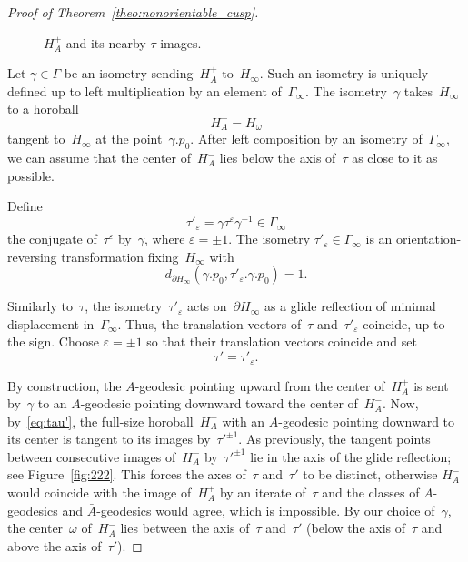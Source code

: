 \documentclass[11pt,reqno]{amsart}
\theoremstyle{definition}
\numberwithin{equation}{section}
\numberwithin{equation}{section}
\begin{document}
\begin{proof}[Proof of Theorem~\ref{theo:nonorientable_cusp}]

\medskip

\begin{figure}[htbp!]
\centering
\vspace*{1.4cm}
\hspace*{-0.5cm}
\def\svgwidth{0.4\textheight}

\vspace*{0.3cm}
\caption{$H_A^+$ and its nearby $\tau$-images.} \label{fig:111}
\end{figure}


Let $\gamma \in \Gamma$ be an isometry sending~$H_A^+$ to~$H_\infty$. 
Such an isometry is uniquely defined up to left multiplication by an element of~$\Gamma_\infty$.
The isometry~$\gamma$ takes~$H_\infty$ to a horoball
\[
H_A^- = H_\omega
\]
tangent to~$H_\infty$ at the point~$\gamma . p_0$. 
After left composition by an isometry of~$\Gamma_\infty$, we can assume that the center of~$H_A^-$ lies below the axis of~$\tau$ as close to it as possible.

Define 
\[
\tau'_\varepsilon=\gamma \tau^\varepsilon \gamma^{-1} \in \Gamma_\infty
\]
the conjugate of~$\tau^\varepsilon$ by~$\gamma$, where $\varepsilon = \pm 1$.
The isometry $\tau'_\varepsilon \in \Gamma_\infty$ is an orientation-reversing transformation fixing~$H_\infty$ with
\begin{equation} \label{eq:tau'}
d_{\partial H_\infty}(\gamma.p_0,\tau'_\varepsilon.\gamma.p_0) = 1.
\end{equation}

Similarly to~$\tau$, the isometry~$\tau'_\varepsilon$ acts on~$\partial H_\infty$ as a glide reflection of minimal displacement in~$\Gamma_\infty$.
Thus, the translation vectors of~$\tau$ and~$\tau'_\varepsilon$ coincide, up to the sign.
Choose $\varepsilon = \pm 1$ so that their translation vectors coincide and set 
\[
\tau'=\tau'_\varepsilon.
\]


By construction, the $A$-geodesic pointing upward from the center of~$H_A^+$ is sent by~$\gamma$ to an $A$-geodesic pointing downward toward the center of~$H_A^-$.
Now, by~\eqref{eq:tau'}, the full-size horoball~$H_A^-$ with an $A$-geodesic pointing downward to its center is tangent to its images by~$\tau'^{\pm 1}$.
As previously, the tangent points between consecutive images of~$H_A^-$ by~$\tau'^{\pm 1}$ lie in the axis of the glide reflection; see Figure~\ref{fig:222}.
This forces the axes of~$\tau$ and~$\tau'$ to be distinct, otherwise $H_A^-$ would coincide with the image of~$H_A^+$ by an iterate of~$\tau$ and the classes of $A$-geodesics and $\bar{A}$-geodesics would agree, which is impossible.
By our choice of~$\gamma$, the center~$\omega$ of~$H_A^-$ lies between the axis of~$\tau$ and~$\tau'$ (below the axis of~$\tau$ and above the axis of~$\tau'$). 


\end{proof}
\end{document}
